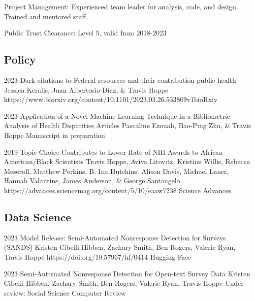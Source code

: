 \documentclass[]{scrartcl}
\begin{document}
\begin{cleanCV}
\WorkExperience
{ }
{Project Management: }
{Experienced team leader for analysis, code, and design. Trained and mentored staff.}

\WorkExperience
{ }
{Public Trust Clearance: }
{Level 5, valid from 2018-2023}



\vspace{-1em}

\subsection{Policy}

\Paper
{2023}
{Dark citations to Federal resources and their contribution public health}
{Jessica Keralis, Juan Albertorio-Díaz, \& Travis Hoppe}
{https://www.biorxiv.org/content/10.1101/2023.03.26.533809v1}{bioRxiv}

\Paper
{2023}
{Application of a Novel Machine Learning Technique in a Bibliometric Analysis of Health Disparities Articles}
{Pascaline Ezouah, Bao-Ping Zhu, \& Travis Hoppe}
{}{Manuscript in preparation}

\Paper
{2019}
{Topic Choice Contributes to Lower Rate of NIH Awards to African-American/Black Scientists}
{Travis Hoppe, Aviva Litovitz, Kristine Willis, Rebecca Meseroll, Matthew Perkins, B. Ian Hutchins, Alison Davis, Michael Lauer, Hannah Valantine, James Anderson, \& George Santangelo}
{https://advances.sciencemag.org/content/5/10/eaaw7238}
{Science Advances}






\subsection{Data Science}

\Paper
{2023}
{Model Release: Semi-Automated Nonresponse Detection for Surveys (SANDS)}
{Kristen Cibelli Hibben, Zachary Smith, Ben Rogers, Valerie Ryan, Travis Hoppe}
{https://doi.org/10.57967/hf/0414}
{Hugging Face}

\Paper
{2023}
{Semi-Automated Nonresponse Detection for Open-text Survey Data}
{Kristen Cibelli Hibben, Zachary Smith, Ben Rogers, Valerie Ryan, Travis Hoppe}
{}
{Under review: Social Science Computer Review}



\end{cleanCV}
\end{document}
